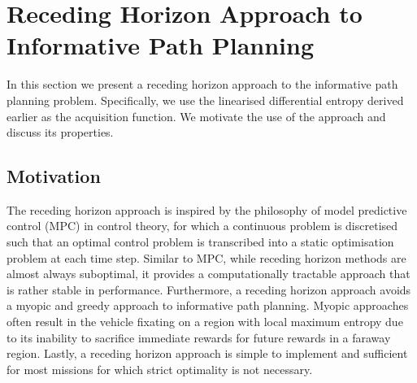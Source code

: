 \documentclass{article}
\begin{document}
\section{Receding Horizon Approach to Informative Path Planning}
\label{Section:RecedingHorizonFormulation}

	In this section we present a receding horizon approach to the informative path planning problem. Specifically, we use the linearised differential entropy derived earlier as the acquisition function. We motivate the use of the approach and discuss its properties.
	
	\subsection{Motivation}
	
		The receding horizon approach is inspired by the philosophy of model predictive control (MPC) in control theory, for which a continuous problem is discretised such that an optimal control problem is transcribed into a static optimisation problem at each time step. Similar to MPC, while receding horizon methods are almost always suboptimal, it provides a computationally tractable approach that is rather stable in performance. Furthermore, a receding horizon approach avoids a myopic and greedy approach to informative path planning. Myopic approaches often result in the vehicle fixating on a region with local maximum entropy due to its inability to sacrifice immediate rewards for future rewards in a faraway region. Lastly, a receding horizon approach is simple to implement and sufficient for most missions for which strict optimality is not necessary.
		
\end{document}
